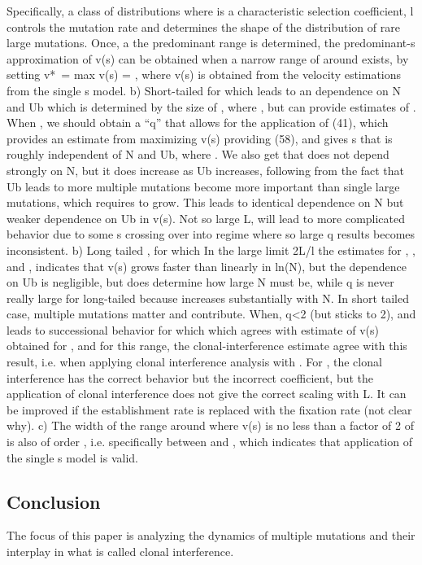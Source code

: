 \documentclass[12pt]{article}
\begin{document}
Specifically, a class of distributions where is a characteristic selection coefficient, l controls the mutation rate and determines the shape of the distribution of rare large mutations.
Once, a the predominant range is determined, the predominant-s approximation of v(s) can be obtained when a narrow range of around exists, by setting v*~= max v(s) = , where v(s) is obtained from the velocity estimations from the single s model.
 b) Short-tailed for which leads to an dependence on N and Ub which is determined by  the size of , where , but can provide estimates of .
When , we should obtain a “q” that allows for the application of (41), which provides an estimate  from maximizing v(s) providing (58), and gives s that is roughly independent of N and Ub, where .  
We also get that does not depend strongly on N, but it does increase as Ub increases, following from the fact that Ub leads to more multiple mutations become more important than single large mutations, which requires to grow.
This leads to identical dependence on N but weaker dependence on Ub in v(s).
Not so large L, will lead to more complicated behavior due to some s crossing over into regime where so large q results becomes inconsistent.
 b) Long tailed , for which 
In the large limit 2L/l the estimates for , , and , indicates that v(s) grows faster than linearly in ln(N), but the dependence on Ub is negligible, but does determine how large N must be, while q is never really large for long-tailed because  increases substantially with N.  In short tailed case, multiple mutations matter and contribute.
When, q<2 (but sticks to 2), and leads to successional behavior for which which agrees with estimate of v(s) obtained for , and for this range, the clonal-interference estimate agree with this result, i.e. when applying clonal interference analysis with .  
For , the clonal interference has the correct behavior but the incorrect coefficient, but the application of clonal interference does not give the correct scaling with L.  It can be improved if the establishment rate is replaced with the fixation rate (not clear why).
 c) The width of the range around where v(s) is no less than a factor of 2 of is also of order , i.e. specifically between and , which indicates that application of the single s model is valid.


\subsection*{Conclusion}

The focus of this paper is analyzing the dynamics of multiple mutations and their interplay in what is called clonal interference.  
\end{document}
